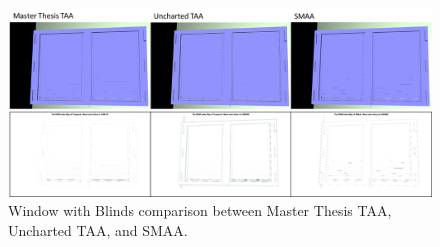 \documentclass[pregrado]{tesis-usb} %
\begin{document}
\begin{figure}[H]
	\centering
	\includegraphics[scale=0.8]{images/results/window_blind.png}
	\caption{Window with Blinds comparison between Master Thesis TAA, Uncharted TAA, and SMAA.}\label{fig:window_blind_render}
\end{figure}
\end{document}
